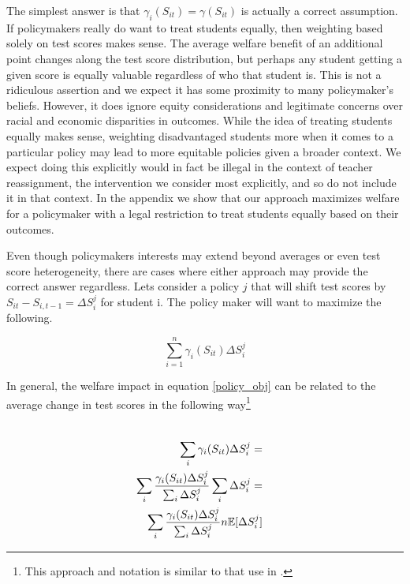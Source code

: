 \documentclass{article}
\theoremstyle{definition}
\theoremstyle{definition}
\theoremstyle{definition}
\theoremstyle{definition}
\begin{document}
    The simplest answer is that $\gamma_i(S_{it}) = \gamma(S_{it})$ is actually a correct assumption. If policymakers really do want to treat students equally, then weighting based solely on test scores makes sense. The average welfare benefit of an additional point changes along the test score distribution, but perhaps any student getting a given score is equally valuable regardless of who that student is. This is not a ridiculous assertion and we expect it has some proximity to many policymaker's beliefs. However, it does ignore equity considerations and legitimate concerns over racial and economic disparities in outcomes. While the idea of treating students equally makes sense, weighting disadvantaged students more when it comes to a particular policy may lead to more equitable policies given a broader context. We expect doing this explicitly would in fact be illegal in the context of teacher reassignment, the intervention we consider most explicitly, and so do not include it in that context. In the appendix we show that our approach maximizes welfare for a policymaker with a legal restriction to treat students equally based on their outcomes. 
    
    Even though policymakers interests may extend beyond averages or even test score heterogeneity, there are cases where either approach may provide the correct answer regardless. Lets consider a policy $j$ that will shift test scores by $S_{it} - S_{i,t-1} = \Delta S_i^j$ for student i.  The policy maker will want to maximize the following.
   
    \large
      \begin{equation}
      \label{policy_obj}
        \sum_{i=1}^n \gamma_i(S_{it})\Delta S_i^j
      \end{equation}
    
    \normalsize
    In general, the welfare impact in equation \ref{policy_obj} can be related to the average change in test scores in the following way\footnote{This approach and notation is similar to that use in \cite{Keyser_2020}. }
    
    \large
    \begin{align*}
       \\ \sum_i \gamma_i(S_{it})\Delta S_i^j =&
       \\ \sum_i \frac{\gamma_i(S_{it})\Delta S_i^j}{\sum_i \Delta S_i^j} \sum_i \Delta S_i^j =&
       \\ \sum_i \frac{\gamma_i(S_{it})\Delta S_i^j}{\sum_i \Delta S_i^j}  n \mathbb{E}[\Delta S_i^j] 
    \end{align*}
      \normalsize 
    
\end{document}
